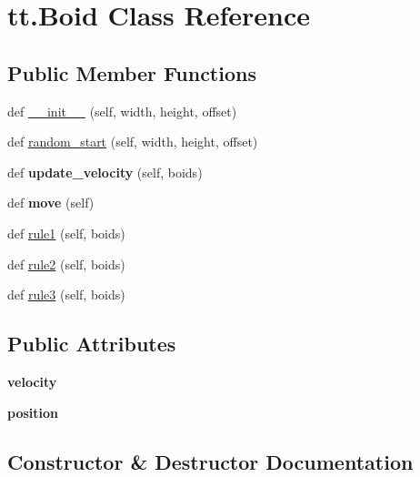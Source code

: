 \hypertarget{classtt_1_1_boid}{}\section{tt.\+Boid Class Reference}
\label{classtt_1_1_boid}
\subsection*{Public Member Functions}
\begin{DoxyCompactItemize}
\item 
def \hyperlink{classtt_1_1_boid_a7f2375c14463c9db1e4f979711df0e54}{\+\_\+\+\_\+init\+\_\+\+\_\+} (self, width, height, offset)
\item 
def \hyperlink{classtt_1_1_boid_a81c49fc92a613f2f6d3184f9ff6587be}{random\+\_\+start} (self, width, height, offset)
\item 
\mbox{\label{classtt_1_1_boid_aa40fb79bf042219ae518fb328bb31d84}} 
def {\bfseries update\+\_\+velocity} (self, boids)
\item 
\mbox{\label{classtt_1_1_boid_a8b2a10fdfb50c77d7ecec6279eae7047}} 
def {\bfseries move} (self)
\item 
def \hyperlink{classtt_1_1_boid_a66693a5cfd3472b06846505a58026657}{rule1} (self, boids)
\item 
def \hyperlink{classtt_1_1_boid_a30d518c7257d2251b0cb51c23015209d}{rule2} (self, boids)
\item 
def \hyperlink{classtt_1_1_boid_abe009e8c75ccd8f9f01227c28258c463}{rule3} (self, boids)
\end{DoxyCompactItemize}
\subsection*{Public Attributes}
\begin{DoxyCompactItemize}
\item 
\mbox{\label{classtt_1_1_boid_ab982564738de2699d5907106ec4a95c6}} 
{\bfseries velocity}
\item 
\mbox{\label{classtt_1_1_boid_a2b4a11107dcbc4042ef5a6307a1a4282}} 
{\bfseries position}
\end{DoxyCompactItemize}


\subsection{Constructor \& Destructor Documentation}
\mbox{\label{classtt_1_1_boid_a7f2375c14463c9db1e4f979711df0e54}} 
